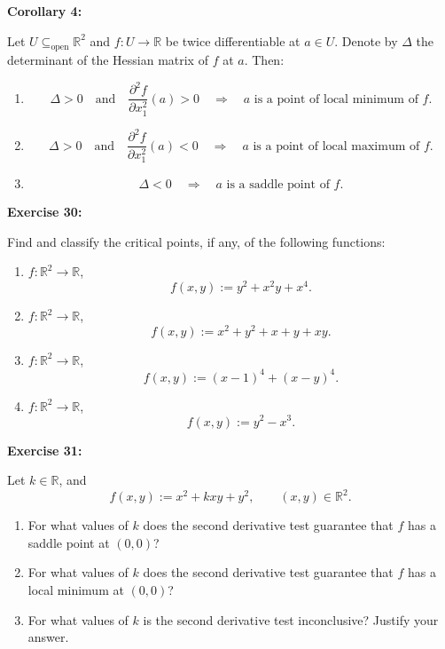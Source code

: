 \documentclass{book}
\begin{document}
\bigskip

\textbf{Corollary 4:}

Let $U \subseteq_{\mathrm{open}} \mathbb{R}^2$ and
$f : U \to \mathbb{R}$ be twice differentiable at $a \in U$.
Denote by $\Delta$ the determinant of the Hessian matrix of $f$ at $a$.
Then:

\begin{enumerate}
\item
\[
\Delta > 0
\quad \text{and} \quad
\frac{\partial^2 f}{\partial x_1^2}(a) > 0
\quad \Longrightarrow \quad
a \text{ is a point of local minimum of } f.
\]

\item
\[
\Delta > 0
\quad \text{and} \quad
\frac{\partial^2 f}{\partial x_1^2}(a) < 0
\quad \Longrightarrow \quad
a \text{ is a point of local maximum of } f.
\]

\item
\[
\Delta < 0
\quad \Longrightarrow \quad
a \text{ is a saddle point of } f.
\]
\end{enumerate}

\bigskip

\textbf{Exercise 30:}

Find and classify the critical points, if any, of the following functions:

\begin{enumerate}
\item
$f : \mathbb{R}^2 \to \mathbb{R}$,
\[
f(x,y) := y^2 + x^2 y + x^4.
\]

\item
$f : \mathbb{R}^2 \to \mathbb{R}$,
\[
f(x,y) := x^2 + y^2 + x + y + xy.
\]

\item
$f : \mathbb{R}^2 \to \mathbb{R}$,
\[
f(x,y) := (x-1)^4 + (x-y)^4.
\]

\item
$f : \mathbb{R}^2 \to \mathbb{R}$,
\[
f(x,y) := y^2 - x^3.
\]
\end{enumerate}

\textbf{Exercise 31:}

Let $k \in \mathbb{R}$, and
\[
f(x,y) := x^2 + kxy + y^2, \qquad (x,y) \in \mathbb{R}^2.
\]

\begin{enumerate}
\item
For what values of $k$ does the second derivative test guarantee that
$f$ has a saddle point at $(0,0)$?

\item
For what values of $k$ does the second derivative test guarantee that
$f$ has a local minimum at $(0,0)$?

\item
For what values of $k$ is the second derivative test inconclusive?
Justify your answer.
\end{enumerate}
\end{document}
